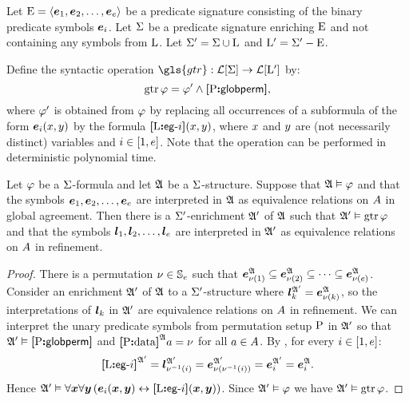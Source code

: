 Let ${\mathrm{E}} = \left\langle \bm{e}_{1},\bm{e}_{2},\dots,\bm{e}_{e} \right\rangle$ be a predicate signature consisting
of the binary predicate symbols $\bm{e}_{i}$.
Let $\mathrm{\Sigma}$ be a predicate signature enriching ${\mathrm{E}}$ and not
containing any symbols from ${\mathrm{L}}$.
Let $\mathrm{\Sigma'} = \mathrm{\Sigma} \cup {\mathrm{L}}$ and
${{\mathrm{L}}'} = \mathrm{\Sigma'} - {\mathrm{E}}$.

\begin{definition}
Define the syntactic operation $\gls{gtr} : \FoF\SigS \to \FoF\LSp$ by:
\[
  \operatorname{gtr}\varphi = {\varphi'} \land {\bm{[}{\mathrm{P}}\mathord{\bm{:}}\mathsf{globperm}\bm{]}},
\]
where ${\varphi'}$ is obtained from $\varphi$ by replacing all occurrences of a
subformula of the form $\bm{e}_{i}(x,y)$ by the formula ${\bm{[}{\mathrm{L}}\mathord{\bm{:}}\mathsf{eg}{\hbox{-}}i\bm{]}}(x,y)$, 
where $x$ and $y$ are (not necessarily distinct) variables and
$i \in [1,e]$. Note that the operation can be performed in deterministic
polynomial time.
\end{definition}

\begin{remark}\label{rem:global-e-to-m}
Let $\varphi$ be a $\mathrm{\Sigma}$-formula and let $\mathfrak{A}$ be a $\mathrm{\Sigma}$-structure.
Suppose that $\mathfrak{A} \vDash \varphi$ and that the symbols 
$\bm{e}_{1},\bm{e}_{2},\dots,\bm{e}_{e}$ are interpreted in $\mathfrak{A}$ as equivalence
relations on $A$ in global agreement.
Then there is a $\mathrm{\Sigma'}$-enrichment $\mathfrak{A'}$ of $\mathfrak{A}$
such that $\mathfrak{A'} \vDash \operatorname{gtr}\varphi$ and that the symbols
$\bm{l}_{1},\bm{l}_{2},\dots,\bm{l}_{e}$ are interpreted in $\mathfrak{A'}$ as equivalence
relations on $A$ in refinement.
\end{remark}
\begin{proof}
There is a permutation $\nu \in \mathbb{S}_{e}$ such that
$\bm{e}_{\nu(1)}^{\mathfrak{A}} \subseteq
\bm{e}_{\nu(2)}^{\mathfrak{A}} \subseteq
\dots \subseteq
\bm{e}_{\nu(e)}^{\mathfrak{A}}$.
Consider an enrichment $\mathfrak{A'}$ of $\mathfrak{A}$
to a $\mathrm{\Sigma'}$-structure where 
$\bm{l}_{k}^{\mathfrak{A'}} = \bm{e}_{\nu(k)}^{\mathfrak{A}}$,
so the interpretations of $\bm{l}_{k}$ in $\mathfrak{A'}$ 
are equivalence relations on $A$ in refinement.
We can interpret the unary predicate symbols from permutation setup 
${\mathrm{P}}$ in $\mathfrak{A'}$ so that 
$\mathfrak{A'} \vDash {\bm{[}{\mathrm{P}}\mathord{\bm{:}}\mathsf{globperm}\bm{]}}$ and 
${\bm{[}{\mathrm{P}}\mathord{\bm{:}}\mathrm{data}\bm{]}}^{\mathfrak{A}}a = \nu$ for all $a \in A$.
By , for every $i \in [1,e]$:
\[
  {\bm{[}{\mathrm{L}}\mathord{\bm{:}}\mathsf{eg}{\hbox{-}}i\bm{]}}^{\mathfrak{A'}} =
  \bm{l}_{\nu^{-1}(i)}^{\mathfrak{A'}} =
  \bm{e}_{\nu(\nu^{-1}(i))}^{\mathfrak{A'}} =
  \bm{e}_{i}^{\mathfrak{A'}} =
  \bm{e}_{i}^{\mathfrak{A}}.
\]
Hence $\mathfrak{A'} \vDash
  \forall\bm{x}\forall\bm{y}
  \left(\bm{e}_{i}(\bm{x},\bm{y}) \leftrightarrow {\bm{[}{\mathrm{L}}\mathord{\bm{:}}\mathsf{eg}{\hbox{-}}i\bm{]}}(\bm{x},\bm{y})\right)$.
Since $\mathfrak{A'} \vDash \varphi$ we have $\mathfrak{A'} \vDash \operatorname{gtr}\varphi$.
\end{proof}

